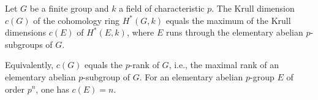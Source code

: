 \begin{theorem}[Quillen]
\label{thm:quillen}
Let $G$ be a finite group and $k$ a field of characteristic $p$. The Krull dimension $c(G)$ of the cohomology ring $H^*(G, k)$ equals the maximum of the Krull dimensions $c(E)$ of $H^*(E, k)$, where $E$ runs through the elementary abelian $p$-subgroups of $G$.

Equivalently, $c(G)$ equals the $p$-rank of $G$, i.e., the maximal rank of an elementary abelian $p$-subgroup of $G$. For an elementary abelian $p$-group $E$ of order $p^n$, one has $c(E) = n$.
\end{theorem}
